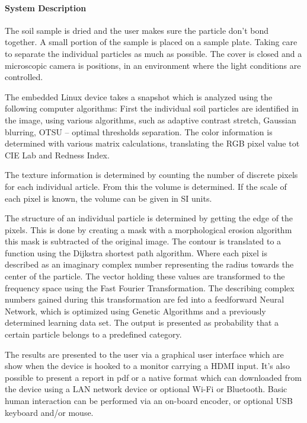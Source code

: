 \paragraph{System Description}
The soil sample is dried and the user makes sure the particle don’t bond together. A small portion of the sample is placed on a sample plate. Taking care to separate the individual particles as much as possible. The cover is closed and a microscopic camera is positions, in an environment where the light conditions are controlled.

The embedded Linux device takes a snapshot which is analyzed using the following computer algorithms: First the individual soil particles are identified in the image, using various algorithms, such as adaptive contrast stretch, Gaussian blurring, OTSU – optimal thresholds separation. The color information is determined with various matrix calculations, translating the RGB pixel value tot CIE Lab and Redness Index.

The texture information is determined by counting the number of discrete pixels for each individual article. From this the volume is determined. If the scale of each pixel is known, the volume can be given in SI units.

The structure of an individual particle is determined by getting the edge of the pixels. This is done by creating a mask with a morphological erosion algorithm this mask is subtracted of the original image. The contour is translated to a function using the Dijkstra shortest path algorithm. Where each pixel is described as an imaginary complex number representing the radius towards the center of the particle. The vector holding these values are transformed to the frequency space using the Fast Fourier Transformation. The describing complex numbers gained during this transformation are fed into a feedforward Neural Network, which is optimized using Genetic Algorithms and a previously determined learning data set. The output is presented as probability that a certain particle belongs to a predefined category.

The results are presented to the user via a graphical user interface which are show when the device is hooked to a monitor carrying a HDMI input. It’s also possible to present a report in pdf or a native format which can downloaded from the device using a LAN network device or optional Wi-Fi or Bluetooth. Basic human interaction can be performed via an on-board encoder, or optional USB keyboard and/or mouse.